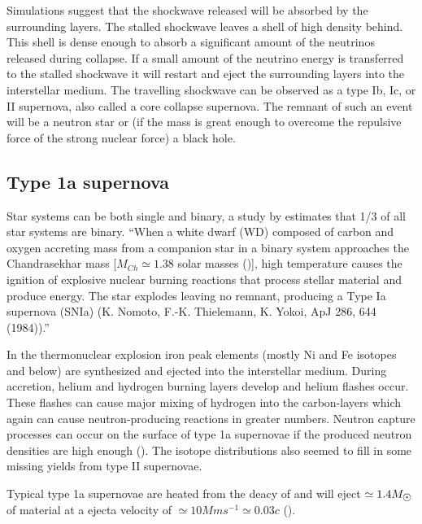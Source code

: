 Simulations suggest that the shockwave released will be absorbed by the surrounding layers.
The stalled shockwave leaves a shell of high density behind.
This shell is dense enough to absorb a significant amount of the neutrinos released during collapse.
If a small amount of the neutrino energy is transferred to the stalled shockwave it will restart and eject the surrounding layers into the interstellar medium.
The travelling shockwave can be observed as a type Ib, Ic, or II supernova, also called a core collapse supernova.
The remnant of such an event will be a neutron star or (if the mass is great enough to overcome the repulsive force of the strong nuclear force) a black hole.

\subsection{Type 1a supernova}
Star systems can be both single and binary, a study by  estimates that 1/3 of all star systems are binary.
``When a white dwarf (WD) composed of carbon and oxygen accreting mass from a companion star in
a binary system approaches the Chandrasekhar mass [$M_{Ch} \simeq 1.38$ solar masses (\msol)], high temperature
causes the ignition of explosive nuclear burning reactions that process stellar material and produce energy.
The star explodes leaving no remnant, producing a Type Ia supernova (SNIa) (K. Nomoto, F.-K. Thielemann, K. Yokoi, ApJ 286, 644 (1984)).''

In the thermonuclear explosion iron peak elements (mostly Ni and Fe isotopes and below) are synthesized and ejected into the interstellar medium.
During accretion, helium and hydrogen burning layers develop and helium flashes occur.
These flashes can cause major mixing of hydrogen into the carbon-layers which again can cause neutron-producing reactions in greater numbers.
Neutron capture processes can occur on the surface of type 1a supernovae if the produced neutron densities are high enough ().
The isotope distributions also seemed to fill in some missing yields from type II supernovae.

Typical type 1a supernovae are heated from the deacy of  and will eject $\simeq 1.4 \msol$ of material at a ejecta velocity of $\simeq10 Mm s^{-1} \simeq 0.03c$ ().

